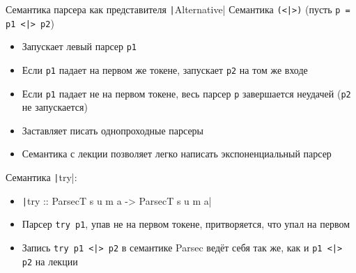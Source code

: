     \begin{frame}[fragile]{Семантика парсера как представителя \texttt|Alternative|}
        \vspace{-0.5em}
        \pause
        Семантика \texttt{(<|>)} (пусть \texttt{p = p1 <|> p2})
        \begin{itemize}
            \item Запускает левый парсер \texttt{p1}
            \item[\then] Если \texttt{p1} падает {\color{red} на первом же токене}, запускает \texttt{p2} на том же входе
            \item[\then] Если \texttt{p1} падает {\color{red} не на первом токене}, весь парсер \texttt{p} завершается неудачей (\texttt{p2} не запускается)
            \item Заставляет писать однопроходные парсеры
            \item Семантика с лекции позволяет легко написать экспоненциальный парсер
        \end{itemize}
        \pause
        \vspace{1em}
        Семантика \texttt|try|:
        \begin{itemize}
            \item[\defi] \texttt|try :: ParsecT s u m a -> ParsecT s u m a|
            \item Парсер \texttt{try p1}, упав не на первом токене, притворяется, что упал на первом
            \item Запись \texttt{try p1 <|> p2} в семантике Parsec ведёт себя так же, как и \texttt{p1 <|> p2} на лекции
        \end{itemize}
    \end{frame}

